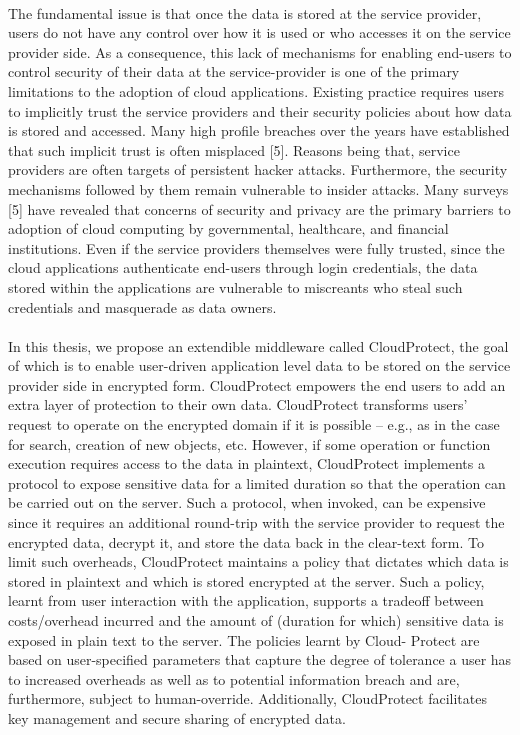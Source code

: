 \documentclass[11pt,onecolumn]{article}
\begin{document}
\paragraph{}

The fundamental issue is that once the data is stored at the service provider, users
do not have any control over how it is used or who accesses it on the service provider
side. As a consequence, this lack of mechanisms for enabling end-users to control
security of their data at the service-provider is one of the primary limitations to the
adoption of cloud applications. Existing practice requires users to implicitly trust the
service providers and their security policies about how data is stored and accessed.
Many high profile breaches over the years have established that such implicit trust
is often misplaced [5]. Reasons being that, service providers are often targets of
persistent hacker attacks. Furthermore, the security mechanisms followed by them
remain vulnerable to insider attacks. Many surveys [5] have revealed that concerns
of security and privacy are the primary barriers to adoption of cloud computing by
governmental, healthcare, and financial institutions. Even if the service providers
themselves were fully trusted, since the cloud applications authenticate end-users
through login credentials, the data stored within the applications are vulnerable to
miscreants who steal such credentials and masquerade as data owners.
\paragraph{}

In this thesis, we propose an extendible middleware called CloudProtect, the goal
of which is to enable user-driven application level data to be stored on the service
provider side in encrypted form. CloudProtect empowers the end users to add an extra
layer of protection to their own data. CloudProtect transforms users’ request to operate
on the encrypted domain if it is possible – e.g., as in the case for search, creation of new objects, etc. However, if some operation or function execution requires access to the data in plaintext, CloudProtect implements a protocol to expose sensitive data
for a limited duration so that the operation can be carried out on the server. Such
a protocol, when invoked, can be expensive since it requires an additional round-trip
with the service provider to request the encrypted data, decrypt it, and store the
data back in the clear-text form. To limit such overheads, CloudProtect maintains a
policy that dictates which data is stored in plaintext and which is stored encrypted at
the server. Such a policy, learnt from user interaction with the application, supports
a tradeoff between costs/overhead incurred and the amount of (duration for which)
sensitive data is exposed in plain text to the server. The policies learnt by Cloud-
Protect are based on user-specified parameters that capture the degree of tolerance a
user has to increased overheads as well as to potential information breach and are,
furthermore, subject to human-override. Additionally, CloudProtect facilitates key
management and secure sharing of encrypted data.
\end{document}
